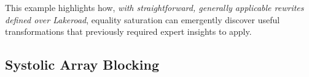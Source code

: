 \documentclass[prologue, dvipsnames, sigplan, screen, review, anonymous]{acmart}
\newcommand{\g}{Lakeroad\xspace}
\begin{document}
This example highlights how,
  \textit{with straightforward,
  generally applicable rewrites
  defined over \g},
  equality saturation
  can emergently discover useful transformations
  that previously required
  expert insights to apply.

\subsection{Systolic Array Blocking}
\label{sec:case-study-blocking}


%
\end{document}
